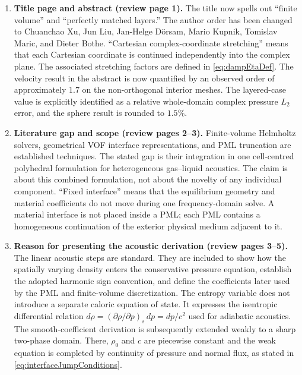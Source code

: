 \documentclass[final,12pt,nopreprintline,longtitle]{elsarticle}
\begin{document}
\begin{enumerate}[leftmargin=*,label=\textbf{R\arabic*.}]
\item \textbf{Title page and abstract (review page 1).}
The title now spells out ``finite volume'' and ``perfectly matched layers.''
The author order has been changed to Chuanchao Xu, Jun Liu, Jan-Helge Dörsam,
Mario Kupnik, Tomislav Maric, and Dieter Bothe.  ``Cartesian complex-coordinate
stretching'' means that each Cartesian coordinate is continued independently
into the complex plane.  The associated stretching factors are defined in
\cref{eq:dampEtaDef}.  The velocity result in the abstract is now quantified by
an observed order of approximately $1.7$ on the non-orthogonal interior meshes.  The
layered-case value is explicitly identified as a relative whole-domain complex
pressure $L_2$ error, and the sphere result is rounded to $1.5\%$.

\item \textbf{Literature gap and scope (review pages 2--3).}
Finite-volume Helmholtz solvers, geometrical VOF interface representations, and
PML truncation are established techniques.  The stated gap is their integration
in one cell-centred polyhedral formulation for heterogeneous gas--liquid
acoustics.  The claim is about this combined formulation, not about the novelty
of any individual component.  ``Fixed interface'' means that the equilibrium
geometry and material coefficients do not move during one frequency-domain
solve.  A material interface is not placed inside a PML; each PML contains a
homogeneous continuation of the exterior physical medium adjacent to it.

\item \textbf{Reason for presenting the acoustic derivation (review pages
3--5).}
The linear acoustic steps are standard.  They are included to show how the
spatially varying density enters the conservative pressure equation, establish
the adopted harmonic sign convention, and define the coefficients later used
by the PML and finite-volume discretization.
The entropy variable does not introduce a separate caloric equation of state.
It expresses the isentropic differential relation
$d\rho=(\partial\rho/\partial p)_s\,dp=dp/c^2$ used for adiabatic acoustics.
The smooth-coefficient derivation is subsequently extended weakly to a sharp
two-phase domain.  There, $\rho_0$ and $c$ are piecewise constant and the weak
equation is completed by continuity of pressure and normal flux, as
stated in \cref{eq:interfaceJumpConditions}.


\end{enumerate}
\end{document}
